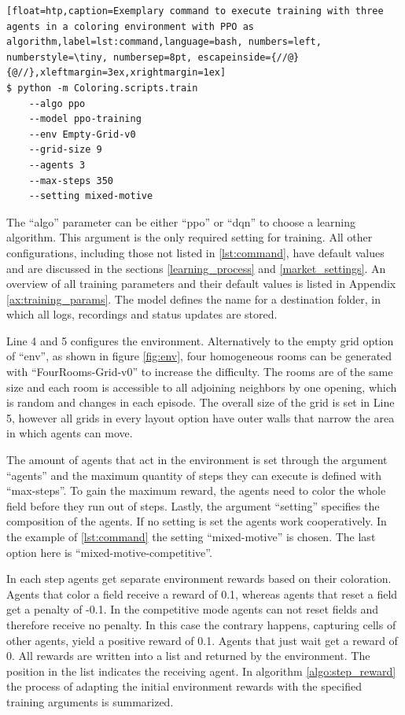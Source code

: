 \begin{lstlisting}[float=htp,caption=Exemplary command to execute training with three agents in a coloring environment with PPO as algorithm,label=lst:command,language=bash, numbers=left, numberstyle=\tiny, numbersep=8pt, escapeinside={//@}{@//},xleftmargin=3ex,xrightmargin=1ex]
$ python -m Coloring.scripts.train
    --algo ppo
    --model ppo-training
    --env Empty-Grid-v0 
    --grid-size 9 
    --agents 3 
    --max-steps 350
    --setting mixed-motive
\end{lstlisting}

The ``algo'' parameter can be either ``ppo'' or ``dqn'' to choose a learning algorithm. This argument is the only required setting for training. All other configurations, including those not listed in \ref{lst:command}, have default values and are discussed in the sections \ref{learning_process} and \ref{market_settings}. An overview of all training parameters and their default values is listed in Appendix \ref{ax:training_params}. The model defines the name for a destination folder, in which all logs, recordings and status updates are stored.

Line 4 and 5 configures the environment. Alternatively to the empty grid option of ``env'', as shown in figure \ref{fig:env}, four homogeneous rooms can be generated with ``FourRooms-Grid-v0'' to increase the difficulty. The rooms are of the same size and each room is accessible to all adjoining neighbors by one opening, which is random and changes in each episode. The overall size of the grid is set in Line 5, however all grids in every layout option have outer walls that narrow the area in which agents can move.

The amount of agents that act in the environment is set through the argument ``agents'' and the maximum quantity of steps they can execute is defined with ``max-steps''. To gain the maximum reward, the agents need to color the whole field before they run out of steps. Lastly, the argument ``setting'' specifies the composition of the agents. If no setting is set the agents work cooperatively. In the example of \ref{lst:command} the setting ``mixed-motive'' is chosen. The last option here is ``mixed-motive-competitive''. %

In each step agents get separate environment rewards based on their coloration. Agents that color a field receive a reward of 0.1, whereas agents that reset a field get a penalty of -0.1. In the competitive mode agents can not reset fields and therefore receive no penalty. In this case the contrary happens, capturing cells of other agents, yield a positive reward of 0.1. Agents that just wait get a reward of 0. All rewards are written into a list and returned by the environment. The position in the list indicates the receiving agent. In algorithm \ref{algo:step_reward} the process of adapting the initial environment rewards with the specified training arguments is summarized.

